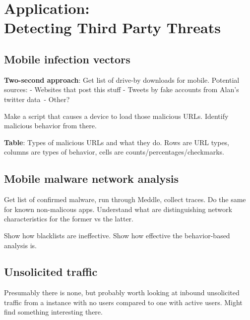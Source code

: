 \section{Application: \\
Detecting Third Party Threats}

\subsection{Mobile infection vectors}

\textbf{Two-second approach}: Get list of drive-by downloads for mobile. Potential sources:
- Websites that post this stuff
- Tweets by fake accounts from Alan's twitter data\
- Other?

Make a script that causes a device to load those malicious URLs. Identify malicious behavior from there.

\textbf{Table}: Types of malicious URLs and what they do. Rows are URL types, columns are types of behavior, cells are counts/percentages/checkmarks. 

\subsection{Mobile malware network analysis}

Get list of confirmed malware, run through Meddle, collect traces. Do the same for known non-malicous apps. 
Understand what are distinguishing network characteristics for the former vs the latter. 

Show how blacklists are ineffective. Show how effective the behavior-based analysis is.

\subsection{Unsolicited traffic}
Presumably there is none, but probably worth looking at inbound unsolicited traffic from a 
\meddle instance with no users compared to one with active users. Might find something interesting there.

